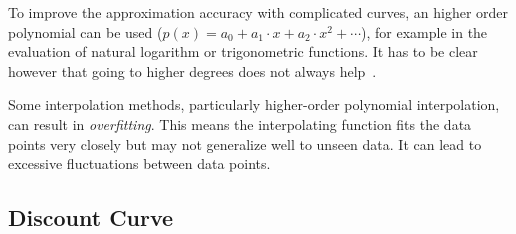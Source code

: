 To improve the approximation accuracy with complicated curves, an higher order polynomial can be used ($p(x)=a_0 + a_1\cdot x + a_2\cdot x^2+\cdots$), for example in the evaluation of natural logarithm or trigonometric functions. It has to be clear however that going to higher degrees does not always help~\cite{bib:runge}.

Some interpolation methods, particularly higher-order polynomial interpolation, can result in \emph{overfitting}. This means the interpolating function fits the data points very closely but may not generalize well to unseen data. It can lead to excessive fluctuations between data points.

\subsection{Discount Curve}

